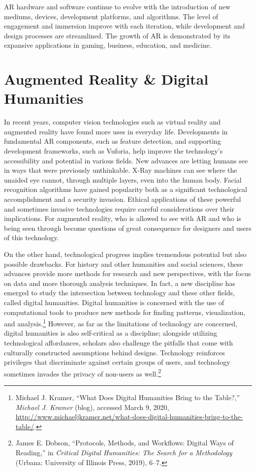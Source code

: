 AR hardware and software continue to evolve with the introduction of new mediums, devices, development platforms, and algorithms. The level of engagement and immersion improve with each iteration, while development and design processes are streamlined. The growth of AR is demonstrated by its expansive applications in gaming, business, education, and medicine.

\section{Augmented Reality \& Digital Humanities}\label{dighuman}
In recent years, computer vision technologies such as virtual reality and augmented reality have found more uses in everyday life. Developments in fundamental AR components, such as feature detection, and supporting development frameworks, such as Vuforia, help improve the technology's accessibility and potential in various fields. New advances are letting humans see in ways that were previously unthinkable. X-Ray machines can see where the unaided eye cannot, through multiple layers, even into the human body. Facial recognition algorithms have gained popularity both as a significant technological accomplishment and a security invasion. Ethical applications of these powerful and sometimes invasive technologies require careful considerations over their implications. For augmented reality, who is allowed to see with AR and who is being seen through become questions of great consequence for designers and users of this technology.

On the other hand, technological progress implies tremendous potential but also possible drawbacks. For history and other humanities and social sciences, these advances provide more methods for research and new perspectives, with the focus on data and more thorough analysis techniques. In fact, a new discipline has emerged to study the intersection between technology and these other fields, called digital humanities. Digital humanities is concerned with the use of computational tools to produce new methods for finding patterns, visualization, and analysis.\footnote{Michael J. Kramer, “What Does Digital Humanities Bring to the Table?,” \textit{Michael J. Kramer} (blog), accessed March 9, 2020, \url{http://www.michaeljkramer.net/what-does-digital-humanities-bring-to-the-table/}.} However, as far as the limitations of technology are concerned, digital humanities is also self-critical as a discipline; alongside utilizing technological affordances, scholars also challenge the pitfalls that come with culturally constructed assumptions behind designs. Technology reinforces privileges that discriminate against certain groups of users, and technology sometimes invades the privacy of non-users as well.\footnote{James E. Dobson, “Protocols, Methods, and Workflows: Digital Ways of Reading,” in \textit{Critical Digital Humanities: The Search for a Methodology} (Urbana: University of Illinois Press, 2019), 6–7.}

